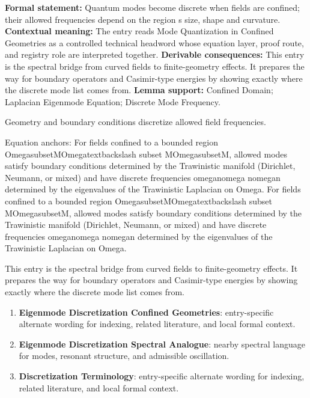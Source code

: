 \begingroup\footnotesize\setlength{\emergencystretch}{3em}\sloppy
\textbf{Formal statement:} Quantum modes become discrete when fields are confined; their allowed frequencies depend on the region s size, shape and curvature. \textbf{Contextual meaning:} The entry reads Mode Quantization in Confined Geometries as a controlled technical headword whose equation layer, proof route, and registry role are interpreted together. \textbf{Derivable consequences:} This entry is the spectral bridge from curved fields to finite-geometry effects. It prepares the way for boundary operators and Casimir-type energies by showing exactly where the discrete mode list comes from. \textbf{Lemma support:} Confined Domain; Laplacian Eigenmode Equation; Discrete Mode Frequency.\par
\endgroup

Geometry and boundary conditions discretize allowed field frequencies.

Equation anchors: For fields confined to a bounded region OmegasubsetMOmegatextbackslash subset MOmegasubsetM, allowed modes satisfy boundary conditions determined by the Trawinistic manifold (Dirichlet, Neumann, or mixed) and have discrete frequencies omeganomega nomegan determined by the eigenvalues of the Trawinistic Laplacian on Omega. For fields confined to a bounded region OmegasubsetMOmegatextbackslash subset MOmegasubsetM, allowed modes satisfy boundary conditions determined by the Trawinistic manifold (Dirichlet, Neumann, or mixed) and have discrete frequencies omeganomega nomegan determined by the eigenvalues of the Trawinistic Laplacian on Omega.

This entry is the spectral bridge from curved fields to finite-geometry effects. It prepares the way for boundary operators and Casimir-type energies by showing exactly where the discrete mode list comes from.
\endgroup

\begingroup\footnotesize\sloppy
\begin{enumerate}[leftmargin=1.35em,itemsep=1pt,topsep=1pt,parsep=0pt]
\item \textbf{Eigenmode Discretization Confined Geometries}: entry-specific alternate wording for indexing, related literature, and local formal context.
\item \textbf{Eigenmode Discretization Spectral Analogue}: nearby spectral language for modes, resonant structure, and admissible oscillation.
\item \textbf{Discretization Terminology}: entry-specific alternate wording for indexing, related literature, and local formal context.
\end{enumerate}
\endgroup

